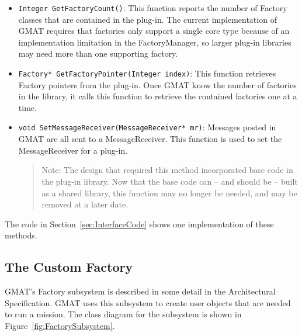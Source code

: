 \documentclass[letterpaper,10pt]{article}
\begin{document}
\begin{itemize}
\item \texttt{Integer GetFactoryCount()}:  This function reports the number of Factory classes
that are contained in the plug-in.  The current implementation of GMAT requires that factories only
support a single core type because of an implementation limitation in the FactoryManager, so larger
plug-in libraries may need more than one supporting factory.
\item \texttt{Factory* GetFactoryPointer(Integer index)}:  This function retrieves Factory pointers
from the plug-in.  Once GMAT know the number of factories in the library, it calls this function to
retrieve the contained factories one at a time.
\item \texttt{void SetMessageReceiver(MessageReceiver* mr)}:  Messages posted in GMAT are all sent
to a MessageReceiver.  This function is used to set the MessageReceiver for a plug-in.

\begin{quote}
\begin{small}Note: The design that required this method incorporated base code in the plug-in
library.  Now that the base code can -- and should be -- built as a shared library, this function
may no longer be needed, and may be removed at a later date.\end{small}
\end{quote}
\end{itemize}

\noindent The code in Section~\ref{sec:InterfaceCode} shows one implementation of these methods.

\subsection{The Custom Factory}

GMAT's Factory subsystem is described in some detail in the Architectural
Specification\cite{ArchSpec}.  GMAT uses this subsystem to create user objects that are needed to
run a mission.  The class diagram for the subsystem is shown in Figure~\ref{fig:FactorySubsystem}.
\end{document}
